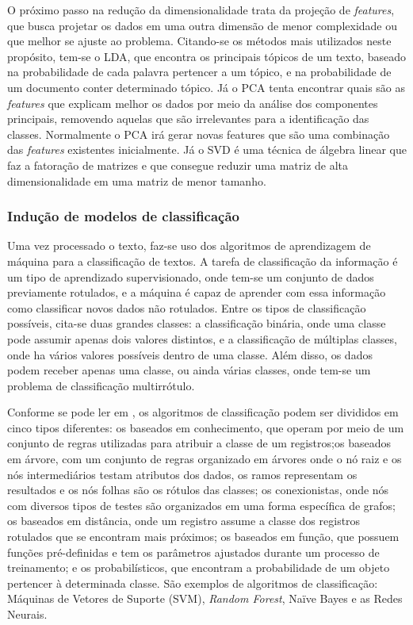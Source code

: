 O próximo passo na redução da dimensionalidade trata da projeção de \textit{features}, que busca projetar os dados em uma outra dimensão de menor complexidade ou que melhor se ajuste ao problema. Citando-se os métodos mais utilizados neste propósito, tem-se o LDA\cite{lda}, que encontra os principais tópicos de um texto, baseado na probabilidade de cada palavra pertencer a um tópico, e na probabilidade de um documento conter determinado tópico. Já o PCA \cite{pca} tenta encontrar quais são as \textit{features} que explicam melhor os dados por meio da análise dos componentes principais, removendo aquelas que são irrelevantes para a identificação das classes. Normalmente o PCA irá gerar novas features que são uma combinação das \textit{features} existentes inicialmente. Já o SVD \cite{svd} é uma técnica de álgebra linear que faz a fatoração de matrizes e que consegue reduzir uma matriz de alta dimensionalidade em uma matriz de menor tamanho. 


\subsubsection{Indução de modelos de classificação}

Uma vez processado o texto, faz-se uso dos algoritmos de aprendizagem de máquina para a classificação de textos. A tarefa de classificação da informação é um tipo de aprendizado supervisionado, onde tem-se um conjunto de dados previamente rotulados, e a máquina é capaz de aprender com essa informação como classificar novos dados não rotulados. Entre os tipos de classificação possíveis, cita-se duas grandes classes: a classificação binária, onde uma classe pode assumir apenas dois valores distintos, e a classificação de múltiplas classes, onde ha vários valores possíveis dentro de uma classe. Além disso, os dados podem receber apenas uma classe, ou ainda várias classes, onde tem-se um problema de classificação multirrótulo. 

Conforme se pode ler em \cite{silva_introducao_2016}, os algoritmos de classificação podem ser divididos em cinco tipos diferentes: os baseados em conhecimento, que operam por meio de um conjunto de regras utilizadas para atribuir a classe de um registros;os baseados em árvore, com um conjunto de regras organizado em árvores onde o nó raiz e os nós intermediários testam atributos dos dados, os ramos representam os resultados e os nós folhas são os rótulos das classes; os conexionistas, onde nós com diversos tipos de testes são organizados em uma forma específica de grafos; os baseados em distância, onde um registro assume a classe dos registros rotulados que se encontram mais próximos; os baseados em função, que possuem funções pré-definidas e tem os parâmetros ajustados durante um processo de treinamento; e os probabilísticos, que encontram a probabilidade de um objeto pertencer à determinada classe. São exemplos de algoritmos de classificação: Máquinas de Vetores de Suporte (SVM), \textit{Random Forest}, Naïve Bayes e as Redes Neurais.

